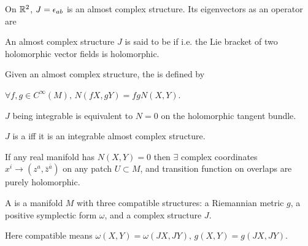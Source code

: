 \documentclass{article}
\begin{document}
\begin{example}
	On $\mathbb{R}^2$, $J = \epsilon_{ab}$ is an almost complex structure. Its eigenvectors as an operator are 
\end{example}


\begin{definition}
		An almost complex structure $J$ is said to be  if 
	i.e. the Lie bracket of two holomorphic vector fields is holomorphic.
\end{definition}

\begin{definition}
	Given an almost complex structure, the  is defined by 
\end{definition}

\begin{lemma}
	$\forall f,g \in C^\infty(M), \, N(fX,gY) = fgN(X,Y)$.
\end{lemma}

\begin{lemma}
	$J$ being integrable is equivalent to $N=0$ on the holomorphic tangent bundle. 
\end{lemma}

\begin{definition}
	$J$ is a  iff it is an integrable almost complex structure. 
\end{definition}

\begin{theorem}
	If any real manifold has $N(X,Y) = 0$ then $\exists$ complex coordinates $x^i \to (z^a,\bar{z}^{\bar{a}})$ on any patch $U\subset M$, and transition function on overlaps are purely holomorphic. 
\end{theorem}

\begin{definition}
A  is a manifold $M$ with three compatible structures: a Riemannian metric $g$, a positive symplectic form $\omega$, and a complex structure $J$.
\end{definition}

\begin{remark}
	Here compatible means $\omega(X,Y) = \omega(JX,JY), \, g(X,Y) = g(JX,JY)$. 
\end{remark}
\end{document}
